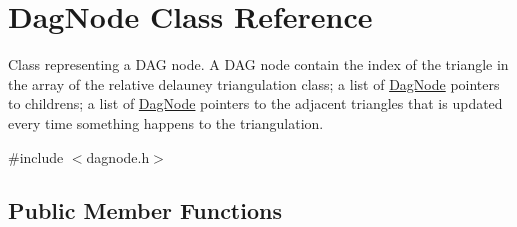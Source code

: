 \hypertarget{classDagNode}{}\section{Dag\+Node Class Reference}
\label{classDagNode}


Class representing a D\+AG node. A D\+AG node contain the index of the triangle in the array of the relative delauney triangulation class; a list of \hyperlink{classDagNode}{Dag\+Node} pointers to childrens; a list of \hyperlink{classDagNode}{Dag\+Node} pointers to the adjacent triangles that is updated every time something happens to the triangulation.  




{\ttfamily \#include $<$dagnode.\+h$>$}

\subsection*{Public Member Functions}
